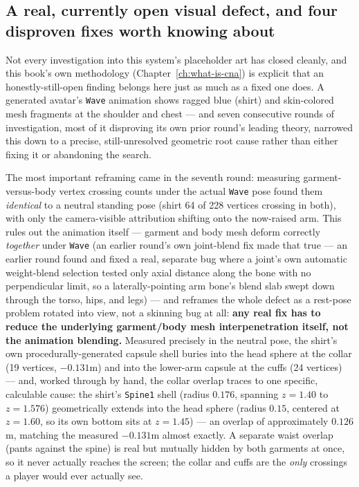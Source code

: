 \subsection{A real, currently open visual defect, and four disproven fixes worth knowing about}

Not every investigation into this system's placeholder art has closed cleanly, and this book's
own methodology (Chapter~\ref{ch:what-is-cna}) is explicit that an honestly-still-open finding
belongs here just as much as a fixed one does. A generated avatar's \texttt{Wave} animation
shows ragged blue (shirt) and skin-colored mesh fragments at the shoulder and chest --- and
seven consecutive rounds of investigation, most of it disproving its own prior round's leading
theory, narrowed this down to a precise, still-unresolved geometric root cause rather than
either fixing it or abandoning the search.

The most important reframing came in the seventh round: measuring garment-versus-body vertex
crossing counts under the actual \texttt{Wave} pose found them \emph{identical} to a neutral
standing pose (shirt 64 of 228 vertices crossing in both), with only the camera-visible
attribution shifting onto the now-raised arm. This rules out the animation itself --- garment
and body mesh deform correctly \emph{together} under \texttt{Wave} (an earlier round's own
joint-blend fix made that true --- an earlier round found and fixed a real, separate bug where
a joint's own automatic weight-blend selection tested only axial distance along the bone with
no perpendicular limit, so a laterally-pointing arm bone's blend slab swept down through the
torso, hips, and legs) --- and reframes the whole defect as a
rest-pose problem rotated into view, not a skinning bug at all: \textbf{any real fix has to
reduce the underlying garment/body mesh interpenetration itself, not the animation blending.}
Measured precisely in the neutral pose, the shirt's own procedurally-generated capsule shell
buries into the head sphere at the collar (19 vertices, $-0.131$m) and into the lower-arm
capsule at the cuffs (24 vertices) --- and, worked through by hand, the collar overlap traces
to one specific, calculable cause: the shirt's \texttt{Spine1} shell (radius $0.176$, spanning
$z{=}1.40$ to $z{=}1.576$) geometrically extends into the head sphere (radius $0.15$, centered
at $z{=}1.60$, so its own bottom sits at $z{=}1.45$) --- an overlap of approximately $0.126$m,
matching the measured $-0.131$m almost exactly. A separate waist overlap (pants against the
spine) is real but mutually hidden by both garments at once, so it never actually reaches the
screen; the collar and cuffs are the \emph{only} crossings a player would ever actually see.

